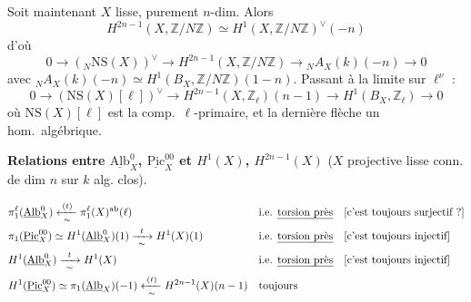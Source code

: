 \documentclass[11pt,a4paper]{article}
\begin{document}
 Soit maintenant $X$ lisse, purement $n$-dim. Alors
\[
  H^{2n-1}(X, \mathbb{Z}/N\mathbb{Z}) \simeq H^{1}(X, \mathbb{Z}/N\mathbb{Z})^{\vee}(-n)
\]
d'où
\[
  0 \to ({}_{N}\mathrm{NS}(X))^{\vee} \to H^{2n-1}(X, \mathbb{Z}/N\mathbb{Z})
  \to {}_{N}A_{X}(k)(-n) \to 0
\]
avec ${}_{N}A_{X}(k)(-n) \simeq H^{1}(B_{X}, \mathbb{Z}/N\mathbb{Z})(1-n)$.
Passant à la limite sur $\ell^{\nu}$ :
\[
  0 \to (\mathrm{NS}(X)[\ell])^{\vee} \to H^{2n-1}(X, \mathbb{Z}_{\ell})(n-1)
  \to H^{1}(B_{X}, \mathbb{Z}_{\ell}) \to 0
\]
où $\mathrm{NS}(X)[\ell]$ est la comp.\ $\ell$-primaire, et la dernière flèche un hom.\ algébrique.

\textbf{Relations entre $\underline{\mathrm{Alb}}^{0}_{X}$, $\underline{\mathrm{Pic}}^{00}_{X}$ et
$H^{1}(X)$, $H^{2n-1}(X)$} ($X$ projective lisse conn. de dim $n$ sur $k$ alg. clos).

\begin{align*}
  &\pi_{1}^{\ell}(\underline{\mathrm{Alb}}^{0}_{X}) \xleftarrow[\ \sim\ ]{(t)} \pi_{1}^{\ell}(X)^{\mathrm{ab}}(\ell)
  && \text{i.e. \emph{torsion près}} \quad [\text{c'est toujours surjectif ?}] \\
  &\pi_{1}(\underline{\mathrm{Pic}}^{00}_{X}) \simeq H^{1}(\underline{\mathrm{Alb}}^{0}_{X})(1)
  \xrightarrow[\ \sim\ ]{t} H^{1}(X)(1)
  && \text{i.e. \emph{torsion près}} \quad [\text{c'est toujours injectif}] \\
  &H^{1}(\underline{\mathrm{Alb}}^{0}_{X}) \xrightarrow[\ \sim\ ]{t} H^{1}(X)
  && \text{i.e. \emph{torsion près}} \quad [\text{c'est toujours injectif}] \\
  &H^{1}(\underline{\mathrm{Pic}}^{00}_{X}) \simeq \pi_{1}(\underline{\mathrm{Alb}}_{X})(-1)
  \xleftarrow[\ \sim\ ]{(t)} H^{2n-1}(X)(n-1)
  && \text{toujours}
\end{align*}
\end{document}

